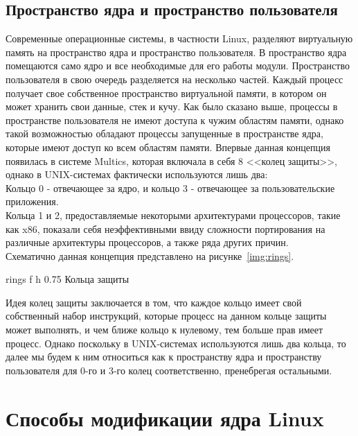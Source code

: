 \subsection{Пространство ядра и пространство пользователя}\label{subsec:----}
Современные операционные системы, в частности Linux, разделяют виртуальную память на пространство ядра и пространство пользователя.
В пространство ядра помещаются само ядро и все необходимые для его работы модули.
Пространство пользователя в свою очередь разделяется на несколько частей.
Каждый процесс получает свое собственное пространство виртуальной памяти, в котором он может хранить свои данные, стек и кучу.
Как было сказано выше, процессы в пространстве пользователя не имеют доступа к чужим областям памяти, однако такой возможностью обладают процессы запущенные в пространстве ядра, которые имеют доступ ко всем областям памяти.
Впервые данная концепция появилась в системе Multics, которая включала в себя 8 <<колец защиты>>\footnotemark, однако в UNIX-системах фактически используются лишь два:
\\
Кольцо 0 - отвечающее за ядро, и кольцо 3 - отвечающее за пользовательские приложения.
\\
Кольца 1 и 2, предоставляемые некоторыми архитектурами процессоров, такие как x86, показали себя неэффективными ввиду сложности портирования на различные архитектуры процессоров, а также ряда других причин.
\\
Схематично данная концепция представлено на рисунке~\ref{img:rings}.


{rings} %
{f}
{h}
{0.75\textwidth} %
{Кольца защиты} %
\newpage

Идея колец защиты заключается в том, что каждое кольцо имеет свой собственный набор инструкций, которые процесс на данном кольце защиты может выполнять, и чем ближе кольцо к нулевому, тем больше прав имеет процесс.
Однако поскольку в UNIX-системах используются лишь два кольца, то далее мы будем к ним относиться как к пространству ядра и пространству пользователя для 0-го и 3-го колец соответственно, пренебрегая остальными.

\section{Способы модификации ядра Linux}\label{sec:--anal--methods}

